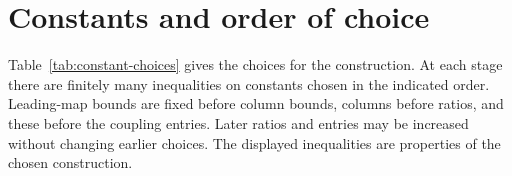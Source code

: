\section{Constants and order of choice}\label{sec:constants}

Table~\ref{tab:constant-choices} gives the choices for the construction. At each stage there are finitely many inequalities on constants chosen in the indicated order. Leading-map bounds are fixed before column bounds, columns before ratios, and these before the coupling entries. Later ratios and entries may be increased without changing earlier choices. The displayed inequalities are properties of the chosen construction.

\begingroup
\setlength{\tabcolsep}{4pt}
\setlength{\LTpre}{0pt}
\setlength{\LTpost}{0pt}
\setlength{\LTcapwidth}{\textwidth}
\setlength{\abovecaptionskip}{3pt}
\setlength{\belowcaptionskip}{3pt}
